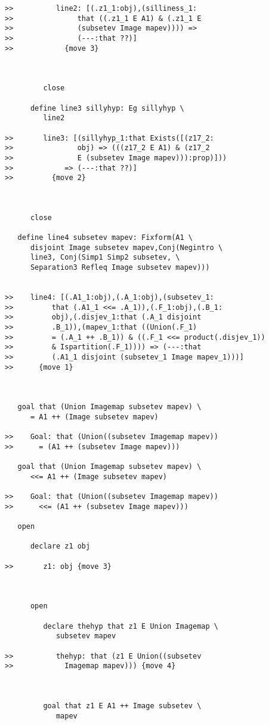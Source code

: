 \documentclass[12pt]{article}
\begin{document}
\begin{verbatim}
>>          line2: [(.z1_1:obj),(silliness_1:
>>               that ((.z1_1 E A1) & (.z1_1 E
>>               (subsetev Image mapev)))) =>
>>               (---:that ??)]
>>            {move 3}



         close

      define line3 sillyhyp: Eg sillyhyp \
         line2

>>       line3: [(sillyhyp_1:that Exists([(z17_2:
>>               obj) => (((z17_2 E A1) & (z17_2
>>               E (subsetev Image mapev))):prop)]))
>>            => (---:that ??)]
>>         {move 2}



      close

   define line4 subsetev mapev: Fixform(A1 \
      disjoint Image subsetev mapev,Conj(Negintro \
      line3, Conj(Simp1 Simp2 subsetev, \
      Separation3 Refleq Image subsetev mapev)))


>>    line4: [(.A1_1:obj),(.A_1:obj),(subsetev_1:
>>         that (.A1_1 <<= .A_1)),(.F_1:obj),(.B_1:
>>         obj),(.disjev_1:that (.A_1 disjoint
>>         .B_1)),(mapev_1:that ((Union(.F_1)
>>         = (.A_1 ++ .B_1)) & ((.F_1 <<= product(.disjev_1))
>>         & Ispartition(.F_1)))) => (---:that
>>         (.A1_1 disjoint (subsetev_1 Image mapev_1)))]
>>      {move 1}



   goal that (Union Imagemap subsetev mapev) \
      = A1 ++ (Image subsetev mapev)

>>    Goal: that (Union((subsetev Imagemap mapev))
>>      = (A1 ++ (subsetev Image mapev)))

   goal that (Union Imagemap subsetev mapev) \
      <<= A1 ++ (Image subsetev mapev)

>>    Goal: that (Union((subsetev Imagemap mapev))
>>      <<= (A1 ++ (subsetev Image mapev)))

   open

      declare z1 obj

>>       z1: obj {move 3}



      open

         declare thehyp that z1 E Union Imagemap \
            subsetev mapev

>>          thehyp: that (z1 E Union((subsetev
>>            Imagemap mapev))) {move 4}



         goal that z1 E A1 ++ Image subsetev \
            mapev


\end{verbatim}
\end{document}
